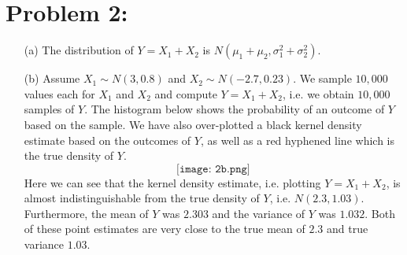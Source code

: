 \documentclass[11pt]{article}
\begin{document}
\section*{Problem 2:}
\begin{itemize}
\item[(a)] The distribution of $Y = X_1+X_2$ is $N(\mu_1+\mu_2,\sigma^2_1+\sigma^2_2)$.
\item[(b)] Assume $X_1\sim N(3, 0.8)$ and $X_2\sim N(-2.7,0.23)$.  We sample $10,000$ values each for $X_1$ and $X_2$ and compute $Y=X_1+X_2$, i.e. we obtain $10,000$ samples of $Y$.  The histogram below shows the probability of an outcome of $Y$ based on the sample.  We have also over-plotted a black kernel density estimate based on the outcomes of $Y$, as well as a red hyphened line which is the true density of $Y$.
\[
\texttt{[image: 2b.png]}
\]
Here we can see that the kernel density estimate, i.e. plotting $Y=X_1+X_2$, is almost indistinguishable from the true density of $Y$, i.e. $N(2.3, 1.03)$.  Furthermore, the mean of $Y$ was $2.303$ and the variance of $Y$ was $1.032$.  Both of these point estimates are very close to the true mean of $2.3$ and true variance $1.03$.


\end{itemize}
\end{document}
